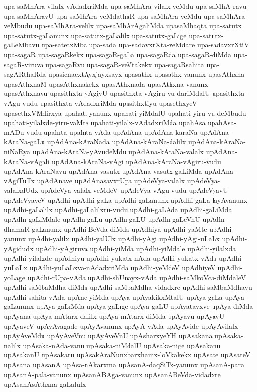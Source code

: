 {upa-saMhAra-vilalx-vAdadxriMda
upa-saMhAra-vilalx-veMdu
upa-saMhA-ravu
upa-saMhAravU
upa-saMhAra-veMdathaR
upa-saMhAra-veMdu
upa-saMhAra-veMbudu
upa-saMhAra-velilx
upa-saMhArAgaliMda
upasaMhaqta
upa-satutx
upa-satutx-gaLanunx
upa-satutx-gaLalilx
upa-satutx-gaLige
upa-satutx-gaLeMbavu
upa-satetxMba
upa-sada
upa-sadavxrXta-veMdare
upa-sadavxrXtiV
upa-sagaR
upa-sagaRkekx
upa-sagaR-gaLa
upa-sagaRda
upa-sagaR-diMda
upa-sagaR-viruva
upa-sagaRvu
upa-sagaR-veVtakekx
upa-sagaRsahita
upa-sagARthaRda
upasicnacxtAyxjayxsayx
upasathx
upasathx-vanunx
upasAthxna
upasAthxnaM
upasAthxnakekx
upasAthxnada
upasAthxna-vanunx
upasAthxnavu
upasithxta-vAgiyU
upasithxta-vAgiru-vu-dariMdalU
upasithxta-vAgu-vudu
upasithxta-vAdadxriMda
upasithxtiyu
upasethxyeV
upasethxVMdirxya
upahati-yanunx
upahati-yiMdalU
upahati-yiru-vu-deMbudu
upahati-yilalxde-yiru-vaMte
upahati-yilalx-vAdadxriMda
upahAsa
upahAsa-mADu-vudu
upahita
upahita-vAda
upAdAna
upAdAna-karaNa
upAdAna-kAraNa-gaLu
upAdAna-kAraNada
upAdAna-kAraNa-dalilx
upAdAna-kAraNa-niNaRya
upAdAna-kAraNa-yAvudeMdu
upAdAna-kAraNa-valalx
upAdAna-kAraNa-vAgali
upAdAna-kAraNa-vAgi
upAdAna-kAraNa-vAgiru-vudu
upAdAna-kAraNavu
upAdAna-vasutx
upAdAna-vasutx-gaLiMda
upAdAna-vAgiTuTx
upAdAnave
upAdAnasavxrUpa
upAdeVya-valalx
upAdeVya-valalxdUdx
upAdeVya-valalx-veMdeV
upAdeVya-vAgu-vudu
upAdeVyavU
upAdeVyaveV
upAdhi
upAdhi-gaLa
upAdhi-gaLanunx
upAdhi-gaLa-layAvanunx
upAdhi-gaLalilx
upAdhi-gaLalilxru-vudu
upAdhi-gaLAda
upAdhi-gaLiMda
upAdhi-gaLiMdale
upAdhi-gaLu
upAdhi-gaLU
upAdhi-gaLeVnU
upAdhi-dhamaR-gaLanunx
upAdhi-BeVda-diMda
upAdhiya
upAdhi-yaMte
upAdhi-yanunx
upAdhi-yalilx
upAdhi-yalUlx
upAdhi-yAgi
upAdhi-yAgi-uLaLx
upAdhi-yAgidudx
upAdhi-yAgiruva
upAdhi-yiMda
upAdhi-yiMdale
upAdhi-yilalxda
upAdhi-yilalxde
upAdhiyu
upAdhi-yukatx-nAda
upAdhi-yukatx-vAda
upAdhi-yuLaLx
upAdhi-yuLaLxva-nAdadxriMda
upAdhi-yeMdeV
upAdhiyeV
upAdhi-yoLage
upAdhi-rUpa-vAda
upAdhi-shUnayx-vAda
upAdhi-saMkoVca-diMdaleV
upAdhi-saMbaMdha-diMda
upAdhi-saMbaMdha-vidadxre
upAdhi-saMbaMdhavu
upAdhi-sahita-vAda
upAne-yiMda
upAya
upAyakikxMtalU
upAya-gaLa
upAya-gaLanunx
upAya-gaLiMda
upAya-gaLige
upAya-gaLU
upAyatavxve
upAya-diMda
upAyana
upAya-mAtarx-dalilx
upAya-mAtarx-diMda
upAyavu
upAyavU
upAyaveV
upAyAvagade
upAyAvanunx
upAyA-vAda
upAyAvide
upAyAvilalx
upAyAveMdu
upAyAveVnu
upAyAveVnU
upAsharxyeYH
upAsakana
upAsaka-nalilx
upAsaka-nAda-vanu
upAsaka-niMdalU
upAsaka-nige
upAsakanu
upAsakanU
upAsakaru
upAsakAraNunxbarxhamx-loVkakekx
upAsate
upAsateV
upAsana
upAsanA
upAsa-nAkarxma
upAsanA-daqSiTx-yanunx
upAsanA-para
upAsanA-pala-vanunx
upAsanABAga-vanunx
upAsanABeVda-vidadxre
upAsanAsAthxna-gaLalulx
}
